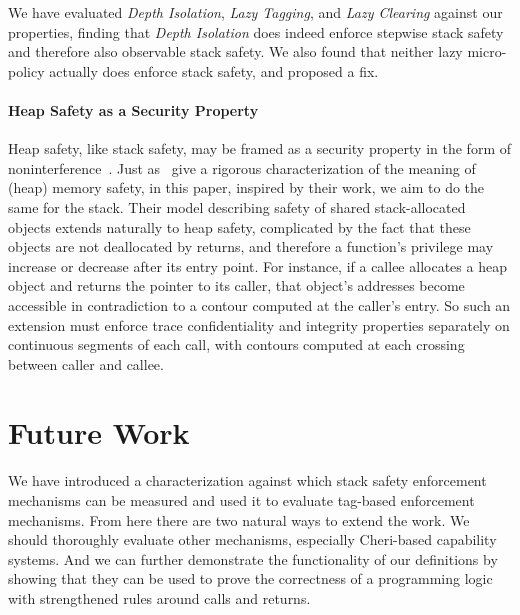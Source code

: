 \documentclass[acmsmall,review,anonymous]{acmart}\settopmatter{printfolios=true,printccs=false,printacmref=false}
\begin{document}
We have evaluated {\em Depth Isolation}, {\em Lazy Tagging}, and {\em Lazy
  Clearing} against our properties, finding that {\em Depth Isolation} does
indeed enforce stepwise stack safety and therefore also observable stack
safety. We also found that neither lazy micro-policy actually does enforce
stack safety, and proposed a fix.

\paragraph{Heap Safety as a Security Property}

Heap safety, like stack safety, may be framed as a security property
in the form of
noninterference~\citep{DBLP:conf/post/AmorimHP18}\ifaftersubmission{}\fi. Just
as~\citeauthor{DBLP:conf/post/AmorimHP18} give a rigorous
characterization of the meaning of (heap) memory safety, in this paper,
inspired by their work, we aim to do the same for the stack.
%
Their model describing safety of shared stack-allocated
objects extends naturally to heap safety, complicated by the fact that
these objects are not deallocated by returns, and therefore a
function's privilege may increase or decrease after its entry
point. For instance, if a callee allocates a heap object and returns
the pointer to its caller, that object's addresses become accessible
in contradiction to a contour computed at the caller's entry. So such
an extension must enforce trace confidentiality and integrity
properties separately on continuous segments of each call, with
contours computed at each crossing between caller and callee.  

\section{Future Work}
\label{sec:future}

We have introduced a characterization against which stack safety enforcement
mechanisms can be measured and used it to evaluate tag-based enforcement mechanisms.
From here there are two natural ways to extend the work. We should thoroughly evaluate
other mechanisms, especially Cheri-based capability systems. And we can further demonstrate
the functionality of our definitions by showing that they can be used to prove
the correctness of a programming logic with strengthened rules around calls and returns.
\end{document}

